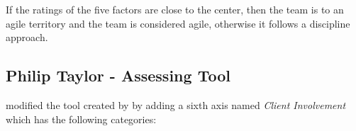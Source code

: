 




If the ratings of the five factors are close to the center, then the team is to an agile territory and the team is considered agile, otherwise it follows a discipline approach.

\subsection{Philip Taylor - Assessing Tool} 
\citet{taylor} modified the tool created by \citet{1231450} by adding a sixth axis named \textit{Client Involvement} which has the following categories:

